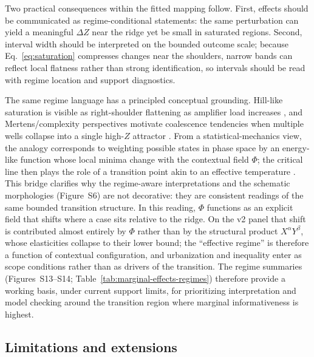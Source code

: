 \documentclass[11pt]{article}
\begin{document}
Two practical consequences within the fitted mapping follow. First, effects should be communicated as regime-conditional statements: the same perturbation can yield a meaningful $\Delta Z$ near the ridge yet be small in saturated regions. Second, interval width should be interpreted on the bounded outcome scale; because Eq.~\eqref{eq:saturation} compresses changes near the shoulders, narrow bands can reflect local flatness rather than strong identification, so intervals should be read with regime location and support diagnostics.

The same regime language has a principled conceptual grounding. Hill-like saturation is visible as right-shoulder flattening as amplifier load increases \parencite{Hill1910}, and Mertens/complexity perspectives motivate coalescence tendencies when multiple wells collapse into a single high-$Z$ attractor \parencite{Mertens1998Partition}. From a statistical-mechanics view, the analogy corresponds to weighting possible states in phase space by an energy-like function whose local minima change with the contextual field $\Phi$; the critical line then plays the role of a transition point akin to an effective temperature \parencite{Sethna2006StatMech,Goldenfeld1992PhaseTransitions}. This bridge clarifies why the regime-aware interpretations and the schematic morphologies (Figure~S6) are not decorative: they are consistent readings of the same bounded transition structure. In this reading, $\Phi$ functions as an explicit field that shifts where a case sits relative to the ridge. On the v2 panel that shift is contributed almost entirely by $\Phi$ rather than by the structural product $X^{\alpha}Y^{\beta}$, whose elasticities collapse to their lower bound; the ``effective regime'' is therefore a function of contextual configuration, and urbanization and inequality enter as scope conditions rather than as drivers of the transition. The regime summaries (Figures~S13--S14; Table~\ref{tab:marginal-effects-regimes}) therefore provide a working basis, under current support limits, for prioritizing interpretation and model checking around the transition region where marginal informativeness is highest.

\subsection*{Limitations and extensions}
\end{document}
